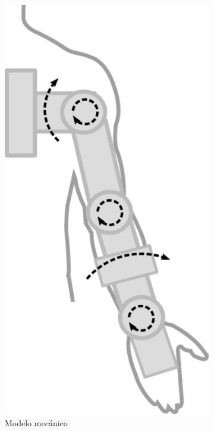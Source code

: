\begin{figure}[!ht]
\begin{subfigure}[b]{0.31\textwidth}
         \centering
         \includegraphics[width=\textwidth]{chapters/cap-normas/brazo2.eps}
         \caption{Modelo mecánico}
         \label{fig:modelobrazo2}
     \end{subfigure}
     \hfill
     \begin{subfigure}[b]{0.31\textwidth}

\end{subfigure}
\end{figure}
